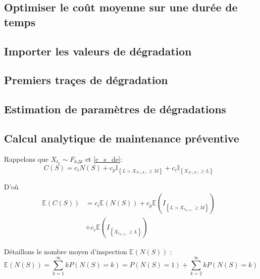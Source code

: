 \documentclass[10pt,a4paper]{article}
\begin{document}
\subsection{Optimiser le coût moyenne sur une durée de temps}
\label{annexe:optim_e_c}

\subsection{Importer les valeurs de dégradation}
\label{annexe:import_degrad}

\subsection{Premiers traçes de dégradation}
\label{annexe:premier_plot_degrad}

\subsection{Estimation de paramètres de dégradations}
\label{annexe:estim_degrad}

\subsection{Calcul analytique de maintenance préventive}
\label{annexe:ana_e_c}
Rappelons que ${X_{{t_k}}} \sim {F_{k\Delta t}}$ et \eqref{c_s_de}:
\[C\left( S \right) = {c_i}N\left( S \right) + {c_p}{\mathbb{I}_{\left\{ {L > {X_{N\left( S \right)}} \geqslant M} \right\}}} + {c_c}{\mathbb{I}_{\left\{ {{X_{N\left( S \right)}} \geqslant L} \right\}}}\]

D'où
\begin{align*}
    \label{e_c_s_de}
    \mathbb{E}\left( {C\left( S \right)} \right) & = {c_i}\mathbb{E}\left( {N\left( S \right)} \right) + {c_p}\mathbb{E}\left( {{I_{\left\{ {L > {X_{{t_{N\left( S \right)}}}} \geqslant M} \right\}}}} \right) \\
    & + {c_c}\mathbb{E}\left( {{I_{\left\{ {{X_{{t_{N\left( S \right)}}}} \geqslant L} \right\}}}} \right)
\end{align*}

Détaillons le nombre moyen d'inspection $\mathbb{E}\left( {N\left( S \right)} \right)$ :
\[\mathbb{E}\left( {N\left( S \right)} \right) = \sum\limits_{k = 1}^\infty  {kP\left( {N\left( S \right) = k} \right)}  = P\left( {N\left( S \right) = 1} \right) + \sum\limits_{k = 2}^\infty  {kP\left( {N\left( S \right) = k} \right)} \]
\end{document}
